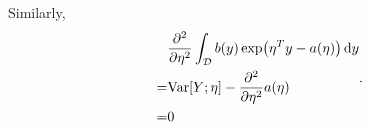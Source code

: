 \begin{answer}
	Similarly,
	\[
		\begin{aligned}
			&
			\pdv[2]{\eta}\int_{\mathcal{D}}
			b(y)\exp(\eta^Ty-a(\eta))\,\dd y
			\\=&
			\mathrm{Var}[Y;\eta]-\pdv[2]{\eta}a(\eta)
			\\=&
			0
		\end{aligned}
	.\] 
\end{answer}
